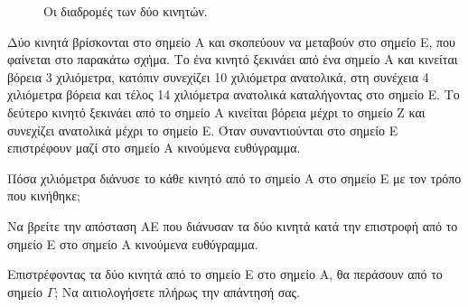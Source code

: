 \begin{figure}
\caption{Οι διαδρομές των δύο κινητών.}
\end{figure}

Δύο κινητά βρίσκονται στο σημείο Α και σκοπεύουν να μεταβούν στο σημείο Ε, που φαίνεται στο παρακάτω σχήμα. Το ένα κινητό ξεκινάει από ένα σημείο Α και κινείται βόρεια 3 χιλιόμετρα, κατόπιν συνεχίζει 10 χιλιόμετρα ανατολικά, στη συνέχεια 4 χιλιόμετρα βόρεια και τέλος 14 χιλιόμετρα ανατολικά καταλήγοντας στο σημείο Ε. Το δεύτερο κινητό ξεκινάει από το σημείο Α κινείται βόρεια μέχρι το σημείο Ζ και συνεχίζει ανατολικά μέχρι το σημείο Ε. Όταν συναντιούνται στο σημείο Ε επιστρέφουν μαζί στο σημείο Α κινούμενα ευθύγραμμα.
\begin{alist}
\item \begin{rlist}
    \item Πόσα χιλιόμετρα διάνυσε το κάθε κινητό από το σημείο Α στο σημείο Ε με τον τρόπο που κινήθηκε; 
    \item Να βρείτε την απόσταση ΑΕ που διάνυσαν τα δύο κινητά κατά την επιστροφή από το σημείο Ε στο σημείο Α κινούμενα ευθύγραμμα. 
\end{rlist}
\item Επιστρέφοντας τα δύο κινητά από το σημείο Ε στο σημείο Α, θα περάσουν από το σημείο $\Gamma$; Να αιτιολογήσετε πλήρως την απάντησή σας. 
\end{alist}